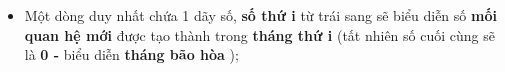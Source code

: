 \begin{itemize}
	\item     Một dòng duy nhất chứa 1 dãy số,    \textbf{      số thứ i}    từ trái sang sẽ biểu diễn số    \textbf{      mối quan hệ mới}    được tạo thành trong    \textbf{      tháng thứ i}    (tất nhiên số cuối cùng sẽ là    \textbf{      0 -}    biểu diễn    \textbf{      tháng bão hòa}    );   
\end{itemize}